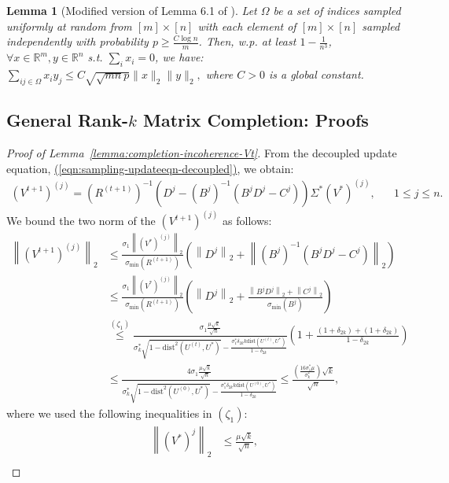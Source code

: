 \documentclass[11pt]{article}
\renewcommand{\eqref}[1]{\hyperref[#1]{(\ref*{#1})}}
\theoremstyle{plain}
\newtheorem{lemma}[theorem]{Lemma}
\theoremstyle{definition}
\newcommand{\rn}{\mathbb{R}^n}
\newcommand{\dist}{\mathrm{dist}}
\newcommand{\twonorm}[1]{\left\| {#1} \right\|_2}
\newcommand{\Vt}{V^{t+1}}
\newcommand{\Vo}{V^*}
\begin{document}
\begin{lemma}[Modified version of Lemma 6.1 of \cite{KeshavanOM2009}]
\label{lem:komlem}
Let $\Omega$ be a set of indices sampled uniformly at random from $[m]\times[n]$ with each element of $[m]\times[n]$ sampled
independently with probability $p\geq \frac{C\log n}{m}$. Then, w.p. at least $1-\frac{1}{n^3}$, $\forall x \in \mathbb{R}^m, y \in \rn$ s.t. $\sum_i x_i=0$, we have: %
$\sum_{ij\in \Omega}x_iy_j\leq C\sqrt{\sqrt{mn}p}\|x\|_2\|y\|_2,$ where $C>0$ is a global constant. 
\end{lemma}
\subsection{General Rank-$k$ Matrix Completion: Proofs}\label{app:compk}
\begin{proof}[Proof of Lemma~\ref{lemma:completion-incoherence-Vt}]
  From the decoupled update equation, \eqref{eqn:sampling-updateeqn-decoupled}, we obtain:
\begin{align*}
    (\Vt)^{(j)} = (R^{(t+1)})^{-1}(D^j-(B^j)^{-1}(B^jD^j-C^j)) \Sigma^*(\Vo)^{(j)},\;\;\;\;  \;\; 1\leq j\leq n.
\end{align*}
We bound the two norm of the $(\Vt)^{(j)}$ as follows:
\begin{align*}
  \twonorm{(\Vt)^{(j)}}
	&\leq \frac{\sigma_1\twonorm{(\Vo)^{(j)}}}{\sigma_{\textrm{min}}\left(R^{(t+1)}\right)} \left( \twonorm{D^j} + \twonorm{(B^j)^{-1}(B^jD^j-C^j)} \right) \\
	&\leq \frac{\sigma_1\twonorm{(\Vo)^{(j)}}}{\sigma_{\textrm{min}}\left(R^{(t+1)}\right)} \left( \twonorm{D^j} + \frac{\twonorm{B^jD^j}+\twonorm{C^j}}{\sigma_{\textrm{min}}\left(B^j\right)} \right) \\
	  &\stackrel{(\zeta_1)}{\leq} \frac{\sigma_1 \frac{\mu \sqrt{k}}{\sqrt{n}}}{\sigma_k^*\sqrt{1-\dist^2\left(U^{(t)},U^*\right)}-\frac{\sigma_1^* \delta_{2k}k\dist(U^{(t)},U^*)}{1-\delta_{2k}}} \left( 1 + \frac{(1+\delta_{2k})+ (1+\delta_{2k}) }{1-\delta_{2k}} \right) \\
	  &\leq \frac{4\sigma_1 \frac{\mu \sqrt{k}}{\sqrt{n}}}{\sigma_k^*\sqrt{1-\dist^2\left(U^{(0)},U^*\right)}-\frac{\sigma_1^* \delta_{2k}k\dist(U^{(0)},U^*)}{1-\delta_{2k}}}
	  \leq \frac{\left(\frac{16\sigma_1^*\mu}{\sigma_k^*}\right)\sqrt{k}}{\sqrt{n}},
\end{align*}
where we used the following inequalities in $(\zeta_1)$:
\begin{align}
  \twonorm{(\Vo)^j} &\leq \frac{\mu \sqrt{k}}{\sqrt{n}}, \label{eqn:Vstar-incoherence-int} \\

\end{align}
\end{proof}
\end{document}
